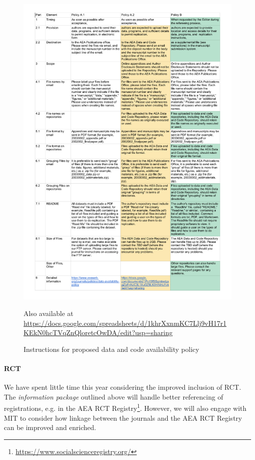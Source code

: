 \documentclass[PP]{AEA}
\newcommand{\urlcite}[2]{#2\footnote{\url{#1}}}
\begin{document}
\begin{figure}
	\includegraphics[width=\textwidth]{images/AEA_Data_and_Code_Availability_Policies_-_Instructions.pdf}
	\caption{Instructions for proposed data and code availability policy\label{fig:instructions}}
	
	\begin{figurenotes}
		 Also available at \url{https://docs.google.com/spreadsheets/d/1khrXxnmKC7Llj9vH17r1KEkN0hcTVqZnQloretcOwDA/edit?usp=sharing}
    \end{figurenotes}
\end{figure}

\paragraph{RCT}
We have spent little time this year considering the improved inclusion of \ac{RCT}. The \textit{information package} outlined above will handle better referencing of registrations, e.g. in the \urlcite{https://www.socialscienceregistry.org/}{AEA RCT Registry}. 
However, we will also engage with MIT to consider how linkage between the journals and the AEA RCT Registry can  be improved and enriched.
\end{document}
